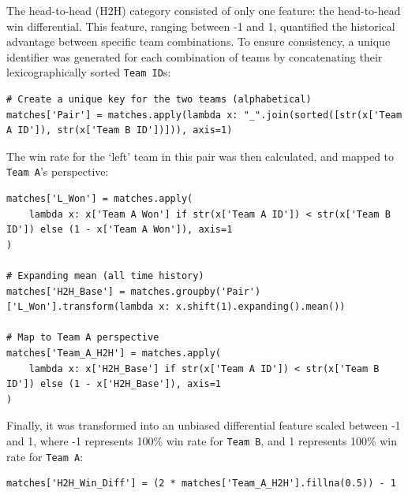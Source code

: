 The head-to-head (H2H) category consisted of only one feature: the head-to-head win differential. This feature, ranging between -1 and 1, quantified the historical advantage between specific team combinations. To ensure consistency, a unique identifier was generated for each combination of teams by concatenating their lexicographically sorted \texttt{Team ID}s:
\begin{lstlisting}[style=code, caption={Unique team-combination key created}]
# Create a unique key for the two teams (alphabetical)
matches['Pair'] = matches.apply(lambda x: "_".join(sorted([str(x['Team A ID']), str(x['Team B ID'])])), axis=1)
\end{lstlisting}

The win rate for the `left' team in this pair was then calculated, and mapped to \texttt{Team A}'s perspective:
\begin{lstlisting}[style=code, caption={Calculate all time mean for left team win rate, mapping the value to Team A's perspective}]
matches['L_Won'] = matches.apply(
    lambda x: x['Team A Won'] if str(x['Team A ID']) < str(x['Team B ID']) else (1 - x['Team A Won']), axis=1
)

# Expanding mean (all time history)
matches['H2H_Base'] = matches.groupby('Pair')['L_Won'].transform(lambda x: x.shift(1).expanding().mean())

# Map to Team A perspective
matches['Team_A_H2H'] = matches.apply(
    lambda x: x['H2H_Base'] if str(x['Team A ID']) < str(x['Team B ID']) else (1 - x['H2H_Base']), axis=1
)
\end{lstlisting}

Finally, it was transformed into an unbiased differential feature scaled between -1 and 1, where -1 represents 100\% win rate for \texttt{Team B}, and 1 represents 100\% win rate for \texttt{Team A}:
\begin{lstlisting}[style=code, caption={Transform Team A specific metric into a differential}]
matches['H2H_Win_Diff'] = (2 * matches['Team_A_H2H'].fillna(0.5)) - 1
\end{lstlisting}

